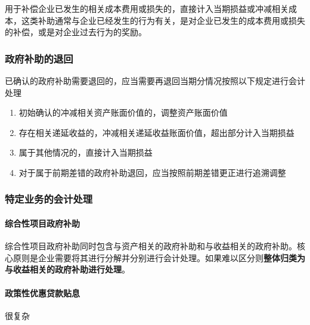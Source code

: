 \documentclass[UTF8,12pt]{ctexart}
\numberwithin{equation}{section} %
\numberwithin{figure}{section}
\numberwithin{table}{section}
\begin{document}
	用于补偿企业已发生的相关成本费用或损失的，直接计入当期损益或冲减相关成本，这类补助通常与企业已经发生的行为有关，是对企业已发生的成本费用或损失的补偿，或是对企业过去行为的奖励。
	
	\subsubsection{政府补助的退回}
	已确认的政府补助需要退回的，应当需要再退回当期分情况按照以下规定进行会计处理
	\begin{enumerate}
		\item 初始确认的冲减相关资产账面价值的，调整资产账面价值
		
		\item 存在相关递延收益的，冲减相关递延收益账面价值，超出部分计入当期损益
		
		\item 属于其他情况的，直接计入当期损益
		
		\item 对于属于前期差错的政府补助退回，应当按照前期差错更正进行追溯调整
	\end{enumerate}
	
	\subsubsection{特定业务的会计处理}
	\paragraph{综合性项目政府补助}
	综合性项目政府补助同时包含与资产相关的政府补助和与收益相关的政府补助。核心原则是企业需要将其进行分解并分别进行会计处理。如果难以区分则\textbf{整体归类为与收益相关的政府补助进行处理}。
	
	\paragraph{政策性优惠贷款贴息}
	很复杂
	
\end{document}
